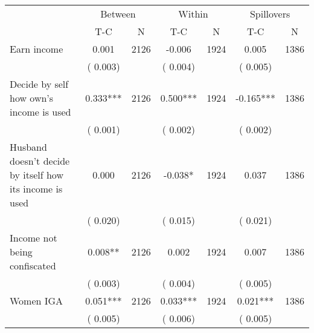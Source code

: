 
\begin{tabular}{l*{6}{c}}\hline&\multicolumn{2}{c}{Between}&\multicolumn{2}{c}{Within}&\multicolumn{2}{c}{Spillovers} \\ \cmidrule(r){2-3}\cmidrule(l){4-5}\cmidrule(l){6-7} & {T-C} & {N} & {T-C} & {N}  & {T-C}  & {N}  \\ \midrule
Earn income        &              0.001      &       2126       &             -0.006      &       1924       &              0.005      &       1386       \\
                       &       (       0.003)            &                               &       (       0.004)            &                               &       (       0.005)            &                               \\
Decide by self how own's income is used        &              0.333***      &       2126       &              0.500***      &       1924       &             -0.165***      &       1386       \\
                       &       (       0.001)            &                               &       (       0.002)            &                               &       (       0.002)            &                               \\
Husband doesn't decide by itself how its income is used        &              0.000      &       2126       &             -0.038*      &       1924       &              0.037      &       1386       \\
                       &       (       0.020)            &                               &       (       0.015)            &                               &       (       0.021)            &                               \\
Income not being confiscated        &              0.008**      &       2126       &              0.002      &       1924       &              0.007      &       1386       \\
                       &       (       0.003)            &                               &       (       0.004)            &                               &       (       0.005)            &                               \\
Women IGA        &              0.051***      &       2126       &              0.033***      &       1924       &              0.021***      &       1386       \\
                       &       (       0.005)            &                               &       (       0.006)            &                               &       (       0.005)            &                               \\

\end{tabular}

